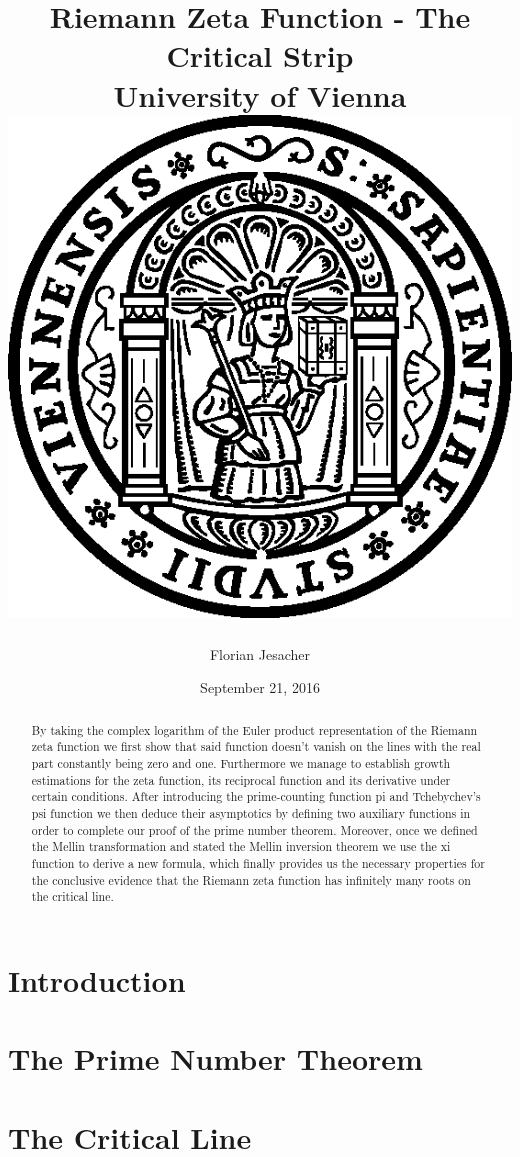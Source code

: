 \documentclass[11pt]{report}
\begin{document}
\title{
	{Riemann Zeta Function - The Critical Strip}\\
	{\large University of Vienna}\\
	{\vspace{3ex}\includegraphics[width=15ex]{University.png}}
}
\author{Florian Jesacher}
\date{September 21, 2016}
\maketitle

\begin{abstract}
By taking the complex logarithm of the Euler product representation of the Riemann zeta function we first show that said function doesn't vanish on the lines with the real part constantly being zero and one. Furthermore we manage to establish growth estimations for the zeta function, its reciprocal function and its derivative under certain conditions. After introducing the prime-counting function pi and Tchebychev's psi function we then deduce their asymptotics by defining two auxiliary functions in order to complete our proof of the prime number theorem. Moreover, once we defined the Mellin transformation and stated the Mellin inversion theorem we use the xi function to derive a new formula, which finally provides us the necessary properties for the conclusive evidence that the Riemann zeta function has infinitely many roots on the critical line.
\end{abstract}

\tableofcontents

\chapter{Introduction}


\chapter{The Prime Number Theorem}


\chapter{The Critical Line}


\appendix


\nocite{*}
\end{document}
